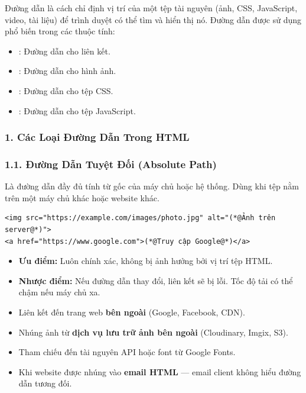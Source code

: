 \begin{conceptBox}
Đường dẫn là cách chỉ định vị trí của một tệp tài nguyên (ảnh, CSS, JavaScript, video, tài liệu) để trình duyệt có thể tìm và hiển thị nó. Đường dẫn được sử dụng phổ biến trong các thuộc tính:
\begin{itemize}[leftmargin=1.5em, itemsep=2pt, parsep=0pt]
    \item {}: Đường dẫn cho liên kết.
    \item {}: Đường dẫn cho hình ảnh.
    \item {}: Đường dẫn cho tệp CSS.
    \item {}: Đường dẫn cho tệp JavaScript.
\end{itemize}
\end{conceptBox}

\subsubsection{1. Các Loại Đường Dẫn Trong HTML}

\subsubsection*{1.1. Đường Dẫn Tuyệt Đối (Absolute Path)}

Là đường dẫn đầy đủ tính từ gốc của máy chủ hoặc hệ thống. Dùng khi tệp nằm trên một máy chủ khác hoặc website khác.

\begin{codeWindow}
\begin{lstlisting}[language=HTML5]
<img src="https://example.com/images/photo.jpg" alt="(*@Ảnh trên server@*)">
<a href="https://www.google.com">(*@Truy cập Google@*)</a>
\end{lstlisting}
\end{codeWindow}

\begin{itemize}[leftmargin=1.5em, itemsep=2pt, parsep=0pt]
    \item \textbf{Ưu điểm:} Luôn chính xác, không bị ảnh hưởng bởi vị trí tệp HTML.
    \item \textbf{Nhược điểm:} Nếu đường dẫn thay đổi, liên kết sẽ bị lỗi. Tốc độ tải có thể chậm nếu máy chủ xa.
\end{itemize}

\begin{tipBox}
\begin{itemize}[leftmargin=1.5em, itemsep=2pt, parsep=0pt]
    \item Liên kết đến trang web \textbf{bên ngoài} (Google, Facebook, CDN).
    \item Nhúng ảnh từ \textbf{dịch vụ lưu trữ ảnh bên ngoài} (Cloudinary, Imgix, S3).
    \item Tham chiếu đến tài nguyên API hoặc font từ Google Fonts.
    \item Khi website được nhúng vào \textbf{email HTML} — email client không hiểu đường dẫn tương đối.
\end{itemize}
\end{tipBox}

